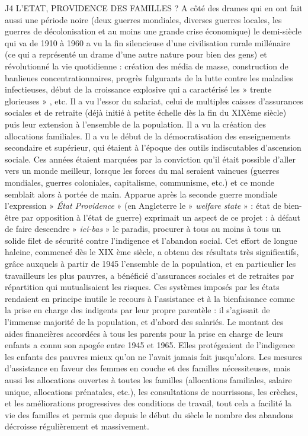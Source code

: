 J4 L'ETAT, PROVIDENCE DES FAMILLES ?
 A côté des drames qui en ont fait aussi une période noire (deux guerres mondiales, diverses guerres locales, les guerres de décolonisation et au moins une grande crise économique) le demi-siècle qui va de 1910 à 1960 a vu la fin silencieuse d'une civilisation rurale millénaire (ce qui a représenté un drame d'une autre nature pour bien des gens) et révolutionné la vie quotidienne : création des média de masse, construction de banlieues concentrationnaires, progrès fulgurants de la lutte contre les maladies infectieuses, début de la croissance explosive qui a caractérisé les » trente glorieuses » , etc. Il a vu l'essor du salariat, celui de multiples caisses d'assurances sociales et de retraite (déjà initié à petite échelle dès la fin du XIXème siècle) puis leur extension à l'ensemble de la population. Il a vu la création des allocations familiales. Il a vu le début de la démocratisation des enseignements secondaire et supérieur, qui étaient à l'époque des outils indiscutables d'ascension sociale. 
 Ces années étaient marquées par la conviction qu'il était possible d'aller vers un monde meilleur, lorsque les forces du mal seraient vaincues (guerres mondiales, guerres coloniales, capitalisme, communisme, etc.) et ce monde semblait alors à portée de main. Apparue après la seconde guerre mondiale l'expression » \emph{État Providence} » (en Angleterre le » \emph{welfare state} » : état de bien-être par opposition à l'état de guerre) exprimait un aspect de ce projet : à défaut de faire descendre » \emph{ici-bas} » le paradis, procurer à tous au moins à tous un solide filet de sécurité contre l'indigence et l'abandon social. 
 Cet effort de longue haleine, commencé dès le XIX ème siècle, a obtenu des résultats très significatifs, grâce auxquels à partir de 1945 l'ensemble de la population, et en particulier les travailleurs les plus pauvres, a bénéficié d'assurances sociales et de retraites par répartition qui mutualisaient les risques. Ces systèmes imposés par les états rendaient en principe inutile le recours à l'assistance et à la bienfaisance comme la prise en charge des indigents par leur propre parentèle : il s'agissait de l'immense majorité de la population, et d'abord des salariés. 
 Le montant des aides financières accordées à tous les parents pour la prise en charge de leurs enfants a connu son apogée entre 1945 et 1965. Elles protégeaient de l'indigence les enfants des pauvres mieux qu'on ne l'avait jamais fait jusqu'alors. 
 Les mesures d'assistance en faveur des femmes en couche et des familles nécessiteuses, mais aussi les allocations ouvertes à toutes les familles (allocations familiales, salaire unique, allocations prénatales, etc.), les consultations de nourrissons, les crèches, et les améliorations progressives des conditions de travail, tout cela a facilité la vie des familles et permis que depuis le début du siècle le nombre des abandons décroisse régulièrement et massivement.
